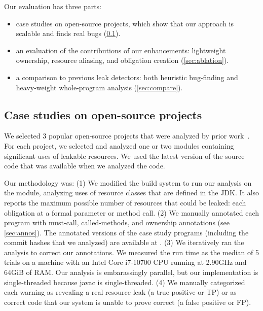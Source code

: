 Our evaluation has three parts:
\begin{itemize}
\item case studies on open-source projects, which show that our approach
  is scalable and finds real bugs (\cref{sec:case-studies}).
\item an evaluation of the contributions of our enhancements:
  lightweight ownership, %
  resource aliasing, %
  and obligation creation %
  (\cref{sec:ablation}).
\item a comparison to previous leak detectors:  both heuristic bug-finding
  and heavy-weight whole-program
  analysis (\cref{sec:compare}).
\end{itemize}

\subsection{Case studies on open-source projects}
\label{sec:case-studies}

We selected 3 popular open-source projects that were analyzed by prior work~\cite{zuo2019grapple}.
For each project, we selected and analyzed one or two modules
containing significant uses of leakable resources. We used
the latest version of the source code that was available
when we analyzed the code.

Our methodology was:
(1)
We modified the
build system to run our analysis on the module, analyzing uses of resource
classes that are defined in the JDK\@.
It also reports the maximum possible number of resources that could be
leaked:  each obligation at a formal parameter or method call.
(2) We manually
annotated each program with must-call, called-methods, and ownership
annotations (see \cref{sec:annos}).
The
annotated versions of the case study programs (including
the commit hashes that we analyzed) are available at
.
(3) We iteratively ran the analysis to correct our annotations.
We measured the run time
as the median of 5 trials on
a machine with an Intel Core i7-10700 CPU running at 2.90GHz and 64GiB of RAM\@.
Our analysis is embarassingly parallel, but our implementation is
single-threaded because javac is single-threaded.
(4) We manually categorized each warning as revealing a
real resource leak (a true positive or TP) or as correct code that our
system is unable to prove correct (a false positive or FP\@).


